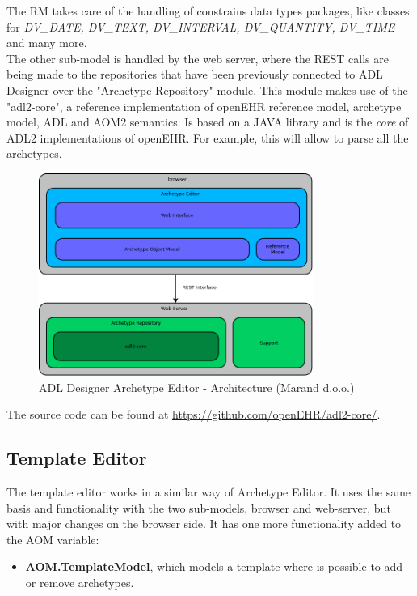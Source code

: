 \documentclass[mim_thesis.tex]{subfiles}
\begin{document}
The RM takes care of the handling of constrains data types packages, like classes for \textit{DV\_DATE, DV\_TEXT, DV\_INTERVAL, DV\_QUANTITY, DV\_TIME} and many more. \\ 

The other sub-model is handled by the web server, where the REST calls are being made to the repositories that have been previously connected to ADL Designer over the "Archetype Repository" module. This module makes use of the "adl2-core", a reference implementation of openEHR reference model, archetype model, ADL and AOM2 semantics. Is based on a JAVA library and is the \textit{core} of ADL2 implementations of openEHR. For example, this will allow to parse all the archetypes. \\

\begin{figure}[H]
	\centering
    \includegraphics[width=0.80\textwidth]{img/archetype-editor-architecture.png}
	\caption{ADL Designer Archetype Editor - Architecture (Marand d.o.o.)}
	\label{fig:archetypeEditorArchitecture}
\end{figure}

The source code can be found at \url{https://github.com/openEHR/adl2-core/}. 

\newpage
\subsection{Template Editor}

The template editor works in a similar way of Archetype Editor. It uses the same basis and functionality with the two sub-models, browser and web-server, but with major changes on the browser side. It has one more functionality added to the AOM variable: 
\begin{itemize}[noitemsep]
\item \textbf{AOM.TemplateModel}, which models a template where is possible to add or remove archetypes.
\end{itemize}
\end{document}
